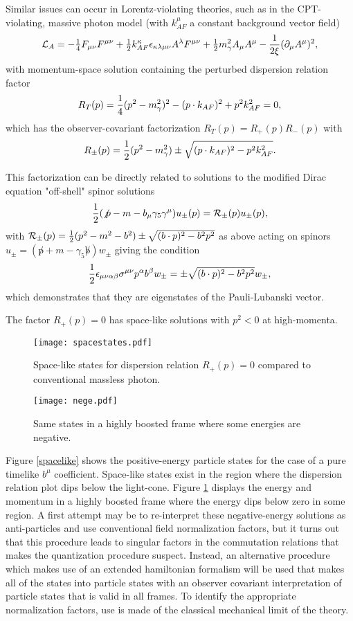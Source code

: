 \documentclass[a4paper]{jpconf}
\def\al{\alpha}
\def\be{\beta}
\def\ga{\gamma}
\def\ep{\epsilon}
\def\si{\sigma}
\def\mn{{\mu\nu}}
\def\frac#1#2{{\textstyle{{#1}\over {#2}}}}
\newcommand{\beq}{\begin{displaymath}}
\newcommand{\eeq}{\end{displaymath}}
\begin{document}
Similar issues can occur in Lorentz-violating theories, such as in the CPT-violating, massive
photon model (with $k_{AF}^\mu$ a constant background vector field)
\beq
\mathcal{L}_A = -\frac14 F_{\mu\nu} F^{\mu\nu} +
\frac12 k_{AF}^\kappa \epsilon_{\kappa\lambda\mu\nu}A^\lambda F^{\mu\nu}  
+ \frac12 m_\gamma^2 A_\mu A^\mu - {1 \over 2 \xi}(\partial_\mu A^\mu)^2,
\eeq
with momentum-space solution containing the perturbed dispersion relation factor 
\beq
R_T (p) ={1 \over 4} (p^2-m_\gamma^2)^2 - (p\cdot k_{AF})^2 + p^2 k_{AF}^2 = 0,
\eeq
which has the observer-covariant factorization $R_T(p) = R_+(p) R_- (p)$ with
\beq
R_\pm(p) = {1 \over 2} (p^2 - m_\gamma^2) \pm \sqrt{(p\cdot k_{AF})^2 - p^2 k_{AF}^2}.
\eeq

This factorization can be directly related to solutions to the modified
Dirac equation "off-shell" spinor solutions
\beq
{1 \over 2}(\not p - m - b_\mu \ga_5 \ga^\mu ) u_\pm(p) = {\cal R}_\pm(p) u_\pm( p),
\eeq
with ${\cal R}_\pm(p) = {1 \over 2} (p^2 - m^2 - b^2) \pm  \sqrt{(b \cdot p)^2 - b^2 p^2}$ as above
acting on spinors $u_\pm = (\not p + m - \ga_5 \not b) w_\pm$ giving the condition
\beq
{1 \over 2} \ep_{\mu\nu\alpha\be}\si^{\mn} p^\al b^\be w_\pm = \pm  \sqrt{(b \cdot p)^2 - b^2 p^2} w_\pm,
\eeq
which demonstrates that they are eigenstates of the Pauli-Lubanski vector.

The factor $R_+ (p) = 0$ has space-like solutions with $p^2 < 0$ at high-momenta.
\begin{figure}[h]
\begin{minipage}{18pc}
\texttt{[image: spacestates.pdf]}
\caption{\label{spacelike}Space-like states for dispersion
relation $R_+(p) = 0$ compared to conventional massless photon.}
\end{minipage}\hspace{2pc}%
\begin{minipage}{18pc}
\texttt{[image: nege.pdf]}
\caption{\label{nege}Same states in a highly boosted frame where some energies are negative.}
\end{minipage} 
\end{figure}
Figure \ref{spacelike} shows the positive-energy particle states for the case of a pure
timelike $b^\mu$ coefficient.  Space-like states exist in the region where the dispersion
relation plot dips below the light-cone.  Figure \ref{nege} displays the energy and momentum
in a highly boosted frame where the energy dips below zero in some region.  
A first attempt may be to re-interpret these negative-energy solutions as anti-particles
and use conventional field normalization factors, but it 
turns out that this procedure leads to singular factors in the commutation relations that 
makes the quantization procedure suspect.  
Instead, an alternative procedure which makes use of an extended hamiltonian formalism will
be used that makes all of the states into particle states with an observer covariant interpretation 
of particle states that is valid in all frames.  
To identify the appropriate normalization factors, 
use is made of the classical mechanical limit of the theory.
\end{document}
